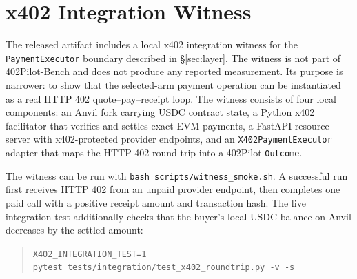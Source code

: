 \section{x402 Integration Witness}
\label{appendix:x402-witness}

The released artifact includes a local x402 integration witness for the
\texttt{PaymentExecutor} boundary described in \S\ref{sec:layer}. The
witness is not part of 402Pilot-Bench and does not produce any reported
measurement. Its purpose is narrower: to show that the selected-arm payment
operation can be instantiated as a real HTTP 402 quote--pay--receipt loop.
The witness consists of four local components: an Anvil fork carrying USDC
contract state, a Python x402 facilitator that verifies and settles exact
EVM payments, a FastAPI resource server with x402-protected provider
endpoints, and an \texttt{X402PaymentExecutor} adapter that maps the HTTP
402 round trip into a 402Pilot \texttt{Outcome}.

The witness can be run with \texttt{bash scripts/witness\_smoke.sh}. A
successful run first receives HTTP 402 from an unpaid provider endpoint,
then completes one paid call with a positive receipt amount and transaction
hash. The live integration test additionally checks that the buyer's local
USDC balance on Anvil decreases by the settled amount:
\begin{quote}
\footnotesize
\texttt{X402\_INTEGRATION\_TEST=1}\\
\texttt{pytest tests/integration/test\_x402\_roundtrip.py -v -s}
\end{quote}
